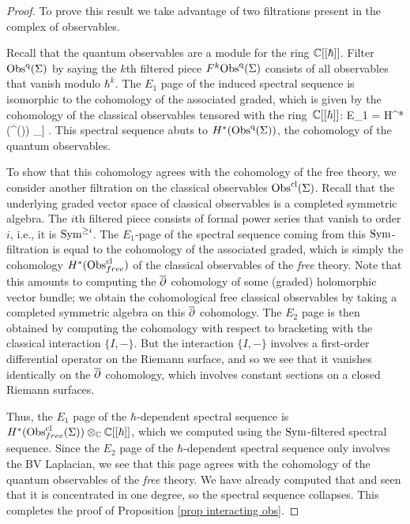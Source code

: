\begin{proof}%
To prove this result we take advantage of two filtrations present in the complex of observables. 

Recall that the quantum observables are a module for the ring $\mathbb C[[\hbar]]$.
Filter ${\rm Obs}^{\rm q}(\Sigma)$ by saying the $k$th filtered piece $F^k {\rm Obs}^{\rm q} (\Sigma)$ consists of all observables that vanish modulo $\hbar^k$. 
The $E_1$ page of the induced spectral sequence is isomorphic to the cohomology of the associated graded, which is given by the cohomology of the classical observables tensored with the ring~$\mathbb C[[\hbar]]$:
\ben
E_1 = H^*(\Obs^{\cl}(\Sigma)) \tensor_\CC \CC[[\hbar]] .
\een 
This spectral sequence abuts to $H^*({\rm Obs}^{\rm q}(\Sigma))$, the cohomology of the quantum observables. 

To show that this cohomology agrees with the cohomology of the free theory,  we consider another filtration on the classical observables ${\rm Obs}^{{\rm cl}}(\Sigma)$.
Recall that the underlying graded vector space of classical observables is a completed symmetric algebra. 
The $i$th filtered piece consists of formal power series that vanish to order $i$, i.e., it is ${\rm Sym}^{\geq i}$. 
The $E_1$-page of the spectral sequence coming from this ${\rm Sym}$-filtration is equal to the cohomology of the associated graded, which is simply the cohomology $H^*({\rm Obs}^{{\rm cl}}_{free})$ of the classical observables of the {\em free} theory. 
Note that this amounts to computing the $\overline{\partial}$ cohomology of some (graded) holomorphic vector bundle;
we obtain the cohomological free classical observables by taking a completed symmetric algebra on this $\overline{\partial}$ cohomology.
The $E_2$ page is then obtained by computing the cohomology with respect to bracketing with the classical interaction $\{I,-\}$. 
But the interaction $\{I,-\}$ involves a first-order differential operator on the Riemann surface, 
and so we see that it vanishes identically on the $\overline{\partial}$ cohomology, which involves constant sections on a closed Riemann surfaces. 

Thus, the $E_1$ page of the $\hbar$-dependent spectral sequence is $H^*({\rm Obs}^{{\rm cl}}_{free}(\Sigma)) \otimes_\mathbb C \mathbb C[[\hbar]]$, which we computed using the ${\rm Sym}$-filtered spectral sequence. 
Since the $E_2$ page of the  $\hbar$-dependent spectral sequence only involves the BV Laplacian, we see that this page agrees with the cohomology of the quantum observables of the {\em free} theory. 
We have already computed that and seen that it is concentrated in one degree,
so the spectral sequence collapses.
This completes the proof of Proposition \ref{prop interacting obs}.
\end{proof}

